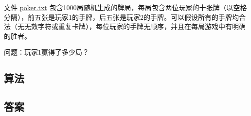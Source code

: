 \begin{tcolorbox}[breakable]
    文件 \href{https://projecteuler.net/resources/documents/0054_poker.txt}{poker.txt} 包含1000局随机生成的牌局，每局包含两位玩家的十张牌（以空格分隔），前五张是玩家1的手牌，后五张是玩家2的手牌。可以假设所有的手牌均合法（无无效字符或重复卡牌），每位玩家的手牌无顺序，并且在每局游戏中有明确的胜者。

	问题：玩家1赢得了多少局？

\end{tcolorbox}

\subsection{算法}

\subsection{答案}
